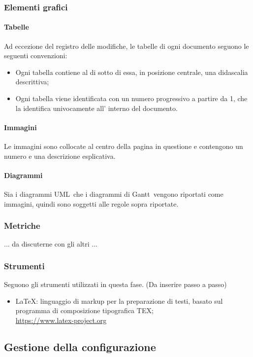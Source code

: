 \subsubsection{Elementi grafici}
\paragraph{Tabelle}
Ad eccezione del registro delle modifiche, le tabelle di ogni documento seguono le seguenti convenzioni:
\begin{itemize}
    \item Ogni tabella contiene al di sotto di essa, in posizione centrale, una didascalia descrittiva;
    \item Ogni tabella viene identificata con un numero progressivo a partire da 1, che la identifica univocamente all' interno del documento.
\end{itemize}
\paragraph{Immagini}
Le immagini sono collocate al centro della pagina in questione e contengono un numero e una descrizione esplicativa.
\paragraph{Diagrammi}
Sia i diagrammi UML\glo\ che i diagrammi di Gantt\glo\ vengono riportati come immagini, quindi sono soggetti alle regole sopra riportate.
\subsubsection{Metriche}
... da discuterne con gli altri ...
\subsubsection{Strumenti}
Seguono gli strumenti utilizzati in questa fase. (Da inserire passo a passo)
\begin{itemize}
    \item \LaTeX: linguaggio di markup per la preparazione di testi, basato sul programma di composizione tipografica TEX;\\
         \url{https://www.latex-project.org}
    
\end{itemize}



\subsection{Gestione della configurazione}\label{subsection:gestione_configurazione}

